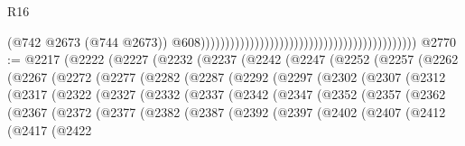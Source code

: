 \begin{lexlean}{R16}
\begin{coremodule}
                                                                                            (@742
                                                                                              @2673
                                                                                              (@744
                                                                                                @2673))
                                                                                            @608))))))))))))))))))))))))))))))))))))))))))))
@2770 := @2217
    (@2222
      (@2227
        (@2232
          (@2237
            (@2242
              (@2247
                (@2252
                  (@2257
                    (@2262
                      (@2267
                        (@2272
                          (@2277
                            (@2282
                              (@2287
                                (@2292
                                  (@2297
                                    (@2302
                                      (@2307
                                        (@2312
                                          (@2317
                                            (@2322
                                              (@2327
                                                (@2332
                                                  (@2337
                                                    (@2342
                                                      (@2347
                                                        (@2352
                                                          (@2357
                                                            (@2362
                                                              (@2367
                                                                (@2372
                                                                  (@2377
                                                                    (@2382
                                                                      (@2387
                                                                        (@2392
                                                                          (@2397
                                                                            (@2402
                                                                              (@2407
                                                                                (@2412
                                                                                  (@2417
                                                                                    (@2422

\end{coremodule}
\end{lexlean}
